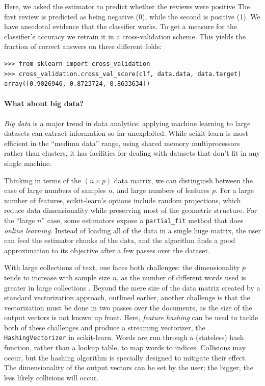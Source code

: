 \documentclass[a4paper]{article}
\begin{document}
Here, we asked the estimator to predict whether the reviews were positive
The first review is predicted as being negative (0),
while the second is positive (1). We have
anecdotal evidence that the classifier works. To get a measure for the
classifier's accuracy we retrain it in a cross-validation scheme.
This yields the fraction of correct answers on three different folds:
\begin{lstlisting}
>>> from sklearn import cross_validation
>>> cross_validation.cross_val_score(clf, data.data, data.target)
array([0.9026946, 0.8723724, 0.8633634])
\end{lstlisting}

\paragraph{What about big data?}
%
\emph{Big data} is a major trend in data analytics: applying machine
learning to large datasets can extract information so far unexploited.
While scikit-learn is most efficient in the ``medium data'' range,
using shared memory multiprocessors rather than clusters,
it has facilities for dealing with datasets that don't fit
in any single machine.

Thinking in terms of the $(n \times p)$ data matrix,
we can distinguish between the case of large numbers of samples $n$,
and large numbers of features $p$.
For a large number of features, scikit-learn's options include
random projections, which reduce data dimensionality
while preserving most of the geometric structure.
For the ``large $n$'' case, some estimators expose a \texttt{partial\_fit}
method that does \emph{online learning}.
Instead of loading all of the data in a single huge matrix, the user
can feed the estimator chunks of the data,
and the algorithm finds a good approximation to its objective
after a few passes over the dataset.

With large collections of text, one faces both challenges:
the dimensionality $p$
tends to increase with sample size $n$, as the number of different words used
is greater in large collections \cite[88--89]{manning2009}.
Beyond the mere size of the data matrix
created by a standard vectorization approach, outlined earlier, another challenge
is that the vectorization must be done in two passes over the documents,
as the size of the output vectors is not known up front.
Here, \emph{feature hashing} can be used
to tackle both of these challenges and produce a streaming vectorizer,
the {\tt HashingVectorizer} in scikit-learn.
Words are run through a (stateless) hash function, rather than a lookup table,
to map words to indices.
Collisions may occur, but the hashing algorithm \cite{weinberger2009}
is specially designed to mitigate their effect.
The dimensionality of the output vectors can be set by the user;
the bigger, the less likely collisions will occur.
\end{document}
